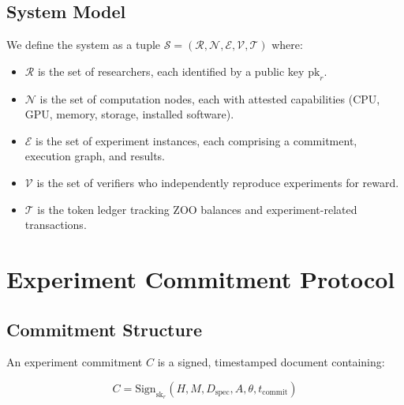 \documentclass[11pt,a4paper]{article}
\begin{document}
\subsection{System Model}

We define the system as a tuple $\mathcal{S} = (\mathcal{R}, \mathcal{N}, \mathcal{E}, \mathcal{V}, \mathcal{T})$ where:

\begin{itemize}[leftmargin=*]
    \item $\mathcal{R}$ is the set of researchers, each identified by a public key $\text{pk}_r$.
    \item $\mathcal{N}$ is the set of computation nodes, each with attested capabilities (CPU, GPU, memory, storage, installed software).
    \item $\mathcal{E}$ is the set of experiment instances, each comprising a commitment, execution graph, and results.
    \item $\mathcal{V}$ is the set of verifiers who independently reproduce experiments for reward.
    \item $\mathcal{T}$ is the token ledger tracking ZOO balances and experiment-related transactions.
\end{itemize}

\section{Experiment Commitment Protocol}
\label{sec:commitments}

\subsection{Commitment Structure}

An experiment commitment $C$ is a signed, timestamped document containing:

\begin{equation}
    C = \text{Sign}_{\text{sk}_r}\left(H, M, D_{\text{spec}}, A, \theta, t_{\text{commit}}\right)
\end{equation}
\end{document}
